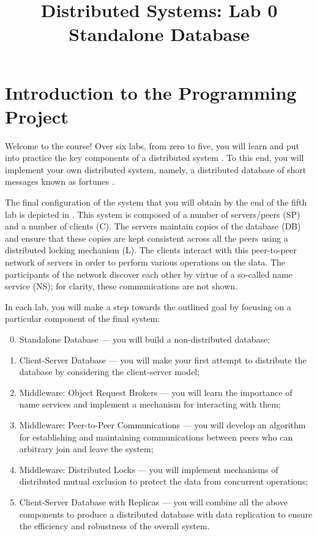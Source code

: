 \documentclass[a4paper,10pt]{article}
\title{%
  Distributed Systems: Lab 0\\%
  Standalone Database%
}
\author{}
\date{}
\begin{document}
\maketitle

\section{Introduction to the Programming Project} 

Welcome to the course! Over six labs, from zero to five, you will learn and put
into practice the key components of a distributed system \cite{lecture1}. To
this end, you will implement your own distributed system, namely, a distributed
database of short messages known as fortunes \cite{fortune}.

The final configuration of the system that you will obtain by the end of the
fifth lab is depicted in . This system is composed of
a number of servers/peers (SP) and a number of clients (C). The servers maintain
copies of the database (DB) and ensure that these copies are kept consistent
across all the peers using a distributed locking mechanism (L). The clients
interact with this peer-to-peer network of servers in order to perform various
operations on the data. The participants of the network discover each other by
virtue of a so-called name service (NS); for clarity, these communications are
not shown.

In each lab, you will make a step towards the outlined goal by focusing on a
particular component of the final system:
\begin{enumerate}

  \setcounter{enumi}{-1}

  \item Standalone Database --- you will build a non-distributed database;

  \item Client-Server Database --- you will make your first attempt to
  distribute the database by considering the client-server model;

  \item Middleware: Object Request Brokers --- you will learn the importance of
  name services and implement a mechanism for interacting with them;

  \item Middleware: Peer-to-Peer Communications --- you will develop an
  algorithm for establishing and maintaining communications between peers who
  can arbitrary join and leave the system;

  \item Middleware: Distributed Locks --- you will implement mechanisms of
  distributed mutual exclusion to protect the data from concurrent operations;

  \item Client-Server Database with Replicas --- you will combine all the above
  components to produce a distributed database with data replication to ensure
  the efficiency and robustness of the overall system.

\end{enumerate}
\end{document}
